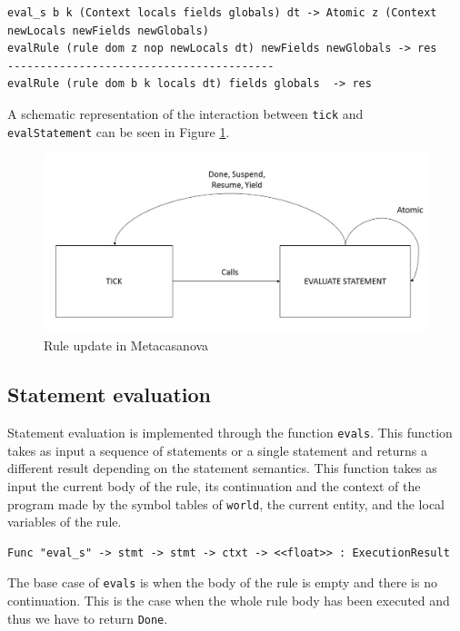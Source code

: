 \begin{lstlisting}
eval_s b k (Context locals fields globals) dt -> Atomic z (Context newLocals newFields newGlobals)
evalRule (rule dom z nop newLocals dt) newFields newGlobals -> res
-----------------------------------------
evalRule (rule dom b k locals dt) fields globals  -> res
\end{lstlisting}

A schematic representation of the interaction between \texttt{tick} and\\ \texttt{evalStatement} can be seen in Figure \ref{fig:ch_mcnv_languages_rule_update}.

\begin{figure}
	\centering
	\includegraphics[width=\textwidth]{Figures/statement_evaluation}
	\caption{Rule update in Metacasanova}
	\label{fig:ch_mcnv_languages_rule_update}
\end{figure}

\subsection{Statement evaluation}
Statement evaluation is implemented through the function \texttt{eval\tu s}. This function takes as input a sequence of statements or a single statement and returns a different result depending on the statement semantics. This function takes as input the current body of the rule, its continuation and the context of the program made by the symbol tables of \texttt{world}, the current entity, and the local variables of the rule.

\begin{lstlisting}
Func "eval_s" -> stmt -> stmt -> ctxt -> <<float>> : ExecutionResult
\end{lstlisting}

\noindent
The base case of \texttt{eval\tu s} is when the body of the rule is empty and there is no continuation. This is the case when the whole rule body has been executed and thus we have to return \texttt{Done}.

